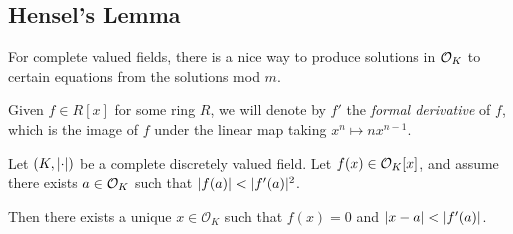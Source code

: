 \documentclass[10pt,a4paper]{article}
\begin{document}
\subsection{Hensel's Lemma}
For complete valued fields, there is a nice way to produce solutions in $\mathcal{O}_K$ to certain equations from the solutions mod $m$.

Given $f \in R[x]$ for some ring $R$, we will denote by $f'$ the \emph{formal derivative} of $f$, which is the image of $f$ under the linear map taking $x^n \mapsto nx^{n-1}$.

\begin{theorem}
  Let $(K, \lvert\cdot\rvert)$ be a complete discretely valued field. Let $f(x) \in \mathcal{O}_K[x]$, and assume there exists $a \in \mathcal{O}_K$ such that $\lvert f(a)\rvert < \lvert f'(a)\rvert^2$.

  Then there exists a unique $x \in \mathcal{O}_K$ such that $f(x) = 0$ and $\lvert x-a\rvert < \lvert f'(a)\rvert$.
\end{theorem}
\end{document}
